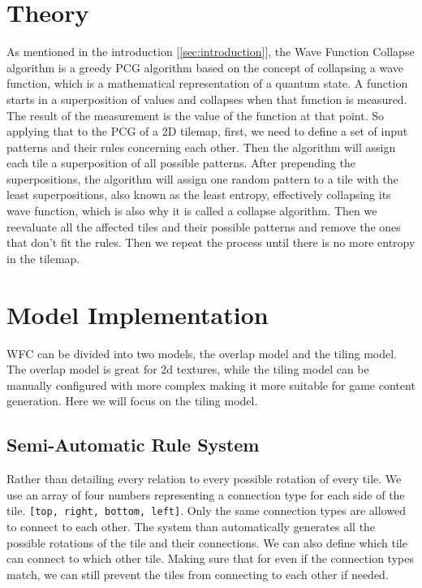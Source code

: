 \documentclass[10pt,oneside,a4paper]{article}
\begin{document}
\section{Theory}\label{sec:theory}
As mentioned in the introduction [\ref*{sec:introduction}], the Wave Function Collapse algorithm is a greedy PCG algorithm based on the concept of collapsing a wave function, which is a mathematical representation of a quantum state.
A function starts in a superposition of values and collapses when that function is measured.
The result of the measurement is the value of the function at that point.
So applying that to the PCG of a 2D tilemap, first, we need to define a set of input patterns and their rules concerning each other.
Then the algorithm will assign each tile a superposition of all possible patterns.
After prepending the superpositions, the algorithm will assign one random pattern to a tile with the least superpositions, also known as the least entropy, effectively collapsing its wave function, which is also why it is called a collapse algorithm.
Then we reevaluate all the affected tiles and their possible patterns and remove the ones that don't fit the rules.
Then we repeat the process until there is no more entropy in the tilemap.

\section{Model Implementation}\label{sec:implementation}
WFC can be divided into two models, the overlap model and the tiling model.
The overlap model is great for 2d textures, while the tiling model can be manually configured with more complex making it more suitable for game content generation.
Here we will focus on the tiling model.

\subsection{Semi-Automatic Rule System}
Rather than detailing every relation to every possible rotation of every tile. We use an array of four numbers representing a connection type for each side of the tile. \texttt{[top, right, bottom, left]}.
Only the same connection types are allowed to connect to each other.
The system than automatically generates all the possible rotations of the tile and their connections.
We can also define which tile can connect to which other tile. Making sure that for even if the connection types match, we can still prevent the tiles from connecting to each other if needed.
\end{document}
